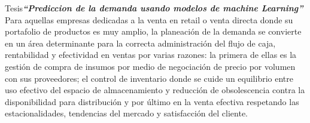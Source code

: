 
\vspace{1\baselineskip}
Tesis\textbf{\textit{“Prediccion de la demanda usando modelos de machine Learning” }}\cite{hincapie2021prediccion} Para aquellas empresas dedicadas a la venta en retail o venta directa donde su portafolio de productos es muy amplio, la planeación de la demanda se convierte en un área determinante para la correcta administración del flujo de caja, rentabilidad y efectividad en ventas por varias razones: la primera de ellas es la gestión de compra de insumos por medio de negociación de precio por volumen con sus proveedores; el control de inventario donde se cuide un equilibrio entre uso efectivo del espacio de almacenamiento y reducción de obsolescencia contra la disponibilidad para distribución y por último en la venta efectiva respetando las estacionalidades, tendencias del mercado y satisfacción del cliente.


